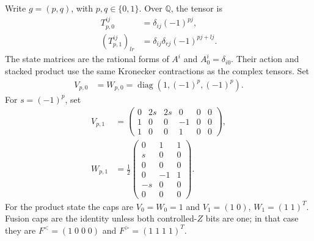 \begin{definition}
    \label{def:mpug_controlled_z_rational_reductions}
    \leanok
    Write $g=(p,q)$, with $p,q\in\{0,1\}$. Over $\mathbb{Q}$, the tensor is
    \begin{align}
        T_{p,0}^{ij}        & =\delta_{ij}(-1)^{pj},               \\
        (T_{p,1}^{ij})_{lr} & =\delta_{ij}\delta_{rj}(-1)^{pj+lj}.
    \end{align}
    The state matrices are the rational forms of $A^i$ and
    $A_0^i=\delta_{i0}$. Their action and stacked product use the same
    Kronecker contractions as the complex tensors. Set
    \begin{align}
        V_{p,0} & =W_{p,0}=\operatorname{diag}(1,(-1)^p,(-1)^p).
    \end{align}
    For $s=(-1)^p$, set
    \begin{align}
        V_{p,1} & =\begin{pmatrix}
                       0 & 2s & 2s & 0  & 0 & 0 \\
                       1 & 0  & 0  & -1 & 0 & 0 \\
                       1 & 0  & 0  & 1  & 0 & 0
                   \end{pmatrix}, \\
        W_{p,1} & =\frac12\begin{pmatrix}
                              0  & 1  & 1 \\
                              s  & 0  & 0 \\
                              0  & 0  & 0 \\
                              0  & -1 & 1 \\
                              -s & 0  & 0 \\
                              0  & 0  & 0
                          \end{pmatrix}.
    \end{align}
    For the product state the caps are $V_{0}=W_{0}=1$ and
    $V_{1}=(1\;0)$, $W_{1}=(1\;1)^T$. Fusion caps are the identity unless
    both controlled-$Z$ bits are one; in that case they are
    $F^<=(1\;0\;0\;0)$ and $F^>=(1\;1\;1\;1)^T$.
\end{definition}

